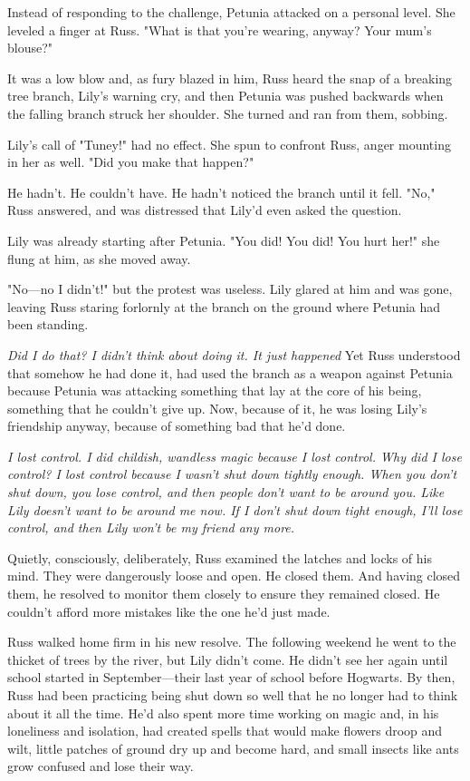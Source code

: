 Instead of responding to the challenge, Petunia attacked on a personal level. She leveled a finger at Russ. "What is that you're wearing, anyway? Your mum's blouse?"

It was a low blow and, as fury blazed in him, Russ heard the snap of a breaking tree branch, Lily's warning cry, and then Petunia was pushed backwards when the falling branch struck her shoulder. She turned and ran from them, sobbing.

Lily's call of "Tuney!" had no effect. She spun to confront Russ, anger mounting in her as well. "Did you make that happen?"

He hadn't. He couldn't have. He hadn't noticed the branch until it fell. "No," Russ answered, and was distressed that Lily'd even asked the question.

Lily was already starting after Petunia. "You did! You did! You hurt her!" she flung at him, as she moved away.

"No—no I didn't!" but the protest was useless. Lily glared at him and was gone, leaving Russ staring forlornly at the branch on the ground where Petunia had been standing.

\emph{Did I do that? I didn't think about doing it. It just happened{\el} }Yet Russ understood that somehow he had done it, had used the branch as a weapon against Petunia because Petunia was attacking something that lay at the core of his being, something that he couldn't give up. Now, because of it, he was losing Lily's friendship anyway, because of something bad that he'd done.

\emph{I lost control. I did childish, wandless magic because I lost control. Why did I lose control? I lost control because I wasn't shut down tightly enough. When you don't shut down, you lose control, and then people don't want to be around you. Like Lily doesn't want to be around me now. If I don't shut down tight enough, I'll lose control, and then Lily won't be my friend any more.}

Quietly, consciously, deliberately, Russ examined the latches and locks of his mind. They were dangerously loose and open. He closed them. And having closed them, he resolved to monitor them closely to ensure they remained closed. He couldn't afford more mistakes like the one he'd just made.

Russ walked home firm in his new resolve. The following weekend he went to the thicket of trees by the river, but Lily didn't come. He didn't see her again until school started in September—their last year of school before Hogwarts. By then, Russ had been practicing being shut down so well that he no longer had to think about it all the time. He'd also spent more time working on magic and, in his loneliness and isolation, had created spells that would make flowers droop and wilt, little patches of ground dry up and become hard, and small insects like ants grow confused and lose their way.

